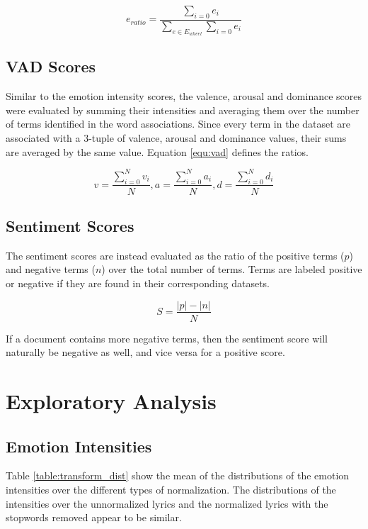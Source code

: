 \documentclass[11pt]{article}
\begin{document}
\begin{equation} \label{equ:emo_ratio}
  e_{ratio} = \frac{\sum_{i=0}e_i}{\sum_{e \in E_{wheel}}\sum_{i=0}e_i}
\end{equation}

\subsection{VAD Scores}

Similar to the emotion intensity scores, the valence, arousal and dominance scores were evaluated by summing their intensities and averaging them over the number of terms identified in the word associations. Since every term in the dataset are associated with a 3-tuple of valence, arousal and dominance values, their sums are averaged by the same value. Equation \ref{equ:vad} defines the ratios.

\begin{equation} \label{equ:vad}
  v = \frac{\sum_{i=0}^{N}v_i}{N}, a = \frac{\sum_{i=0}^{N}a_i}{N}, d = \frac{\sum_{i=0}^{N}d_i}{N}
\end{equation}

\subsection{Sentiment Scores}

The sentiment scores are instead evaluated as the ratio of the positive terms ($p$) and negative terms ($n$) over the total number of terms. Terms are labeled positive or negative if they are found in their corresponding datasets.

\begin{equation}
  S = \frac{|p| - |n|}{N}
\end{equation}

If a document contains more negative terms, then the sentiment score will naturally be negative as well, and vice versa for a positive score.

\section{Exploratory Analysis}

\subsection{Emotion Intensities}

Table \ref{table:transform_dist} show the mean of the distributions of the emotion intensities over the different types of normalization. The distributions of the intensities over the unnormalized lyrics and the normalized lyrics with the stopwords removed appear to be similar.
\end{document}
